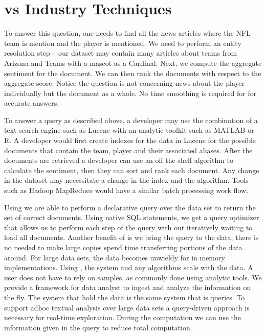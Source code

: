 
\section{{\system } vs Industry Techniques}


To answer this question, one needs to find all the news articles where the
NFL team is mention and the player is mentioned.
We need to perform an entity resolution step -- our dataset may contain many
articles about teams from Arizona and Teams with a mascot as a Cardinal.
Next, we compute the
aggregate sentiment for the document. We can then rank the documents with
respect to the aggregate score.
Notice the question is not concerning news about the player individually
but the document as a whole. No time smoothing is required for
for accurate answers.

To answer a query as described above, a developer may use the combination of
a text search engine such as Lucene with an analytic toolkit such as
MATLAB or R. A developer would first create indexes for the data in Lucene for
the possible documents that contain the team, player and their associated
aliases. After the documents are retrieved a developer can use an off the
shelf algorithm to calculate the sentiment, then they can sort and rank each
document.
Any change in the dataset may necessitate a change in the index and
the algorithm.
Tools such as Hadoop MapReduce would have a similar batch processing
work flow.

Using {\system} we are able to perform a declarative query over the data set
to return the set of correct documents. Using native SQL statements, we get
a query optimizer that allows us to perform each step of the query with
out iteratively waiting to load all documents. Another benefit of {\system} is
we bring the query to the data, there is no needed to make large copies
spend time
transferring portions of the data around. For large data sets, the data becomes
unwieldy for in memory implementations. Using {\system}, the system and any
algorithms scale with the data.
A user does not have to rely on samples, as commonly done using analytic tools.
We provide a framework for data analyst to ingest and analyze the information
on the fly. The system that hold the data is the same system that is queries.
To support adhoc textual analysis over large data sets a query-driven
approach is necessary for real-time exploration. During
the computation we can use the information given in the query to reduce
total computation.

